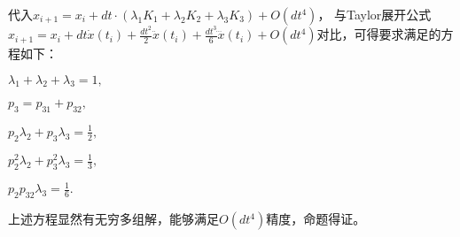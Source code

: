 \documentclass{article}
\begin{document}
代入$x_{i+1}=x_i+dt\cdot(\lambda_1 K_1+\lambda_2 K_2+ \lambda_3 K_3)+O(dt^4)$，
与Taylor展开公式$x_{i+1}=x_i+dt\dot{x}(t_i)+\frac{dt^2}{2}\ddot{x}(t_i)+\frac{dt^3}{6}\dddot{x}(t_i)+O(dt^4)$对比，可得要求满足的方程如下：

$\lambda_1+\lambda_2+\lambda_3=1,$

$p_3=p_{31}+p_{32},$

$p_2\lambda_2+p_3\lambda_3=\frac{1}{2},$


$p_2^2\lambda_2+p_3^2\lambda_3=\frac{1}{3},$

$p_2p_{32}\lambda_3=\frac{1}{6}.$

上述方程显然有无穷多组解，能够满足$O(dt^4)$精度，命题得证。
\end{document}
